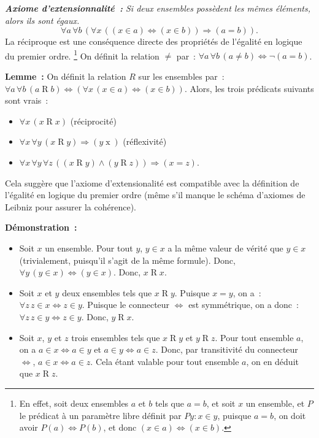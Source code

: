 \medskip

\noindent\textit{\textbf{Axiome d'extensionnalité :} Si deux ensembles possèdent les mêmes éléments, alors ils sont égaux.}
\begin{equation*}
    \forall a \, \forall b \, (
        \forall x \, ((x \in a) \Leftrightarrow (x \in b)) \Rightarrow (a = b)
    ). 
\end{equation*}
La réciproque est une conséquence directe des propriétés de l'égalité en logique du premier ordre.%
\footnote{ En effet, soit deux ensembles $a$ et $b$ tels que $a = b$, et soit $x$ un ensemble, et $P$ le prédicat à un paramètre libre définit par $P y: x \in y$, puisque $a = b$, on doit avoir $P(a) \Leftrightarrow P(b)$, et donc $(x \in a) \Leftrightarrow (x \in b)$.}
On définit la relation $\neq$ par : $\forall a \, \forall b \, (a \neq b) \Leftrightarrow \neg (a = b)$.

\medskip

\noindent\textbf{Lemme :} 
    On définit la relation $R$ sur les ensembles par : $\forall a \, \forall b \, (a \mathrel{R} b) \Leftrightarrow (\forall x \, (x \in a) \Leftrightarrow (x \in b))$. 
    Alors, les trois prédicats suivants sont vrais :
    \begin{itemize}[nosep]
        \item $\forall x \, (x \mathrel{R} x)$ (réciprocité)
        \item $\forall x \, \forall y \, (x \mathrel{R} y) \Rightarrow (y \mathrel{x})$ (réflexivité)
        \item $\forall x \, \forall y \, \forall z \, ((x \mathrel{R} y) \wedge (y \mathrel{R} z)) \Rightarrow (x = z)$.
    \end{itemize}
    Cela suggère que l'axiome d'extensionalité est compatible avec la définition de l'égalité en logique du premier ordre (même s'il manque le schéma d'axiomes de Leibniz pour assurer la cohérence).

\medskip

\noindent\textbf{Démonstration :} 
\begin{itemize}[nosep]
    \item Soit $x$ un ensemble. Pour tout $y$, $y \in x$ a la même valeur de vérité que $y \in x$ (trivialement, puisqu'il s'agit de la même formule).
        Donc, $\forall y \, (y \in x) \Leftrightarrow (y \in x)$. 
        Donc, $x \mathrel{R} x$.
    \item Soit $x$ et $y$ deux ensembles tels que $x \mathrel{R} y$. 
        Puisque $x = y$, on a : $\forall z \, z \in x \Leftrightarrow z \in y$. 
        Puisque le connecteur $\Leftrightarrow$ est symmétrique, on a donc : $\forall z \, z \in y \Leftrightarrow z \in y$.
        Donc, $y \mathrel{R} x$.
    \item Soit $x$, $y$ et $z$ trois ensembles tels que $x \mathrel{R} y$ et $y \mathrel{R} z$. 
        Pour tout ensemble $a$, on a $a \in x \Leftrightarrow a \in y$ et $a \in y \Leftrightarrow a \in z$. 
        Donc, par transitivité du connecteur $\Leftrightarrow$, $a \in x \Leftrightarrow a \in z$. 
        Cela étant valable pour tout ensemble $a$, on en déduit que $x \mathrel{R} z$.
\end{itemize}
\done

